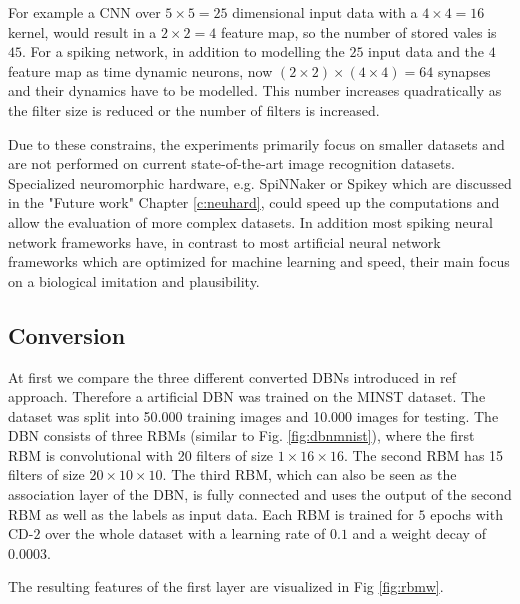 For example a CNN over $5 \times 5 = 25$ dimensional input data with a $4 \times 4 = 16$ kernel, would result in a $2 \times 2 = 4$ feature map, so the number of stored vales is $45$. 
For a spiking network, in addition to modelling the $25$ input data and the $4$ feature map as time dynamic neurons, now $(2 \times 2) \times (4 \times 4) = 64$ synapses and their dynamics have to be modelled.
This number increases quadratically as the filter size is reduced or the number of filters is increased.

Due to these constrains, the experiments primarily focus on smaller datasets and are not performed on current state-of-the-art image recognition datasets. 
Specialized neuromorphic hardware, e.g. SpiNNaker or Spikey which are discussed in the "Future work" Chapter \ref{c:neuhard}, could speed up the computations and allow the evaluation of more complex datasets.  
In addition most spiking neural network frameworks have, in contrast to most artificial neural network frameworks which are optimized for machine learning and speed, their main focus on a biological imitation and plausibility.


\subsection{Conversion} \label{c:conversionexp}

At first we compare the three different converted DBNs introduced in ref approach.
Therefore a artificial DBN was trained on the MINST dataset.
The dataset was split into 50.000 training images and 10.000 images for testing.
The DBN consists of three RBMs (similar to Fig. \ref{fig:dbnmnist}), where the first RBM is convolutional with 20 filters of size $1 \times 16 \times 16$. 
The second RBM has 15 filters of size $20 \times 10 \times 10$. 
The third RBM, which can also be seen as the association layer of the DBN, is fully connected and uses the output of the second RBM as well as the labels as input data.  
Each RBM is trained for $5$ epochs with CD-$2$ over the whole dataset with a learning rate of $0.1$ and a weight decay of $0.0003$.

The resulting features of the first layer are visualized in Fig \ref{fig:rbmw}.

